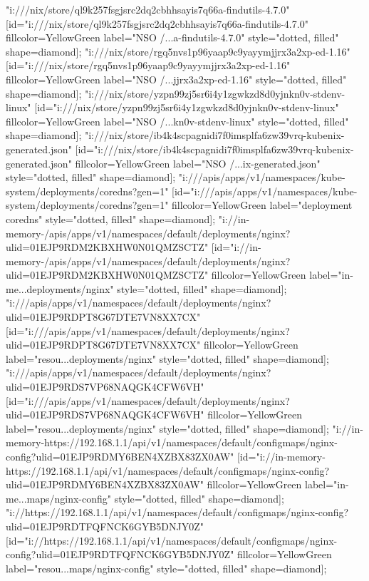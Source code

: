 {"i:///nix/store/ql9k257fsgjsrc2dq2cbhhsayis7q66a-findutils-4.7.0" [id="i:///nix/store/ql9k257fsgjsrc2dq2cbhhsayis7q66a-findutils-4.7.0" fillcolor=YellowGreen label="NSO /...a-findutils-4.7.0" style="dotted, filled" shape=diamond];
"i:///nix/store/rgq5nvs1p96yaap9c9yayymjjrx3a2xp-ed-1.16" [id="i:///nix/store/rgq5nvs1p96yaap9c9yayymjjrx3a2xp-ed-1.16" fillcolor=YellowGreen label="NSO /...jjrx3a2xp-ed-1.16" style="dotted, filled" shape=diamond];
"i:///nix/store/yzpn99zj5sr6i4y1zgwkzd8d0yjnkn0v-stdenv-linux" [id="i:///nix/store/yzpn99zj5sr6i4y1zgwkzd8d0yjnkn0v-stdenv-linux" fillcolor=YellowGreen label="NSO /...kn0v-stdenv-linux" style="dotted, filled" shape=diamond];
"i:///nix/store/ib4k4scpagnidi7f0imsplfa6zw39vrq-kubenix-generated.json" [id="i:///nix/store/ib4k4scpagnidi7f0imsplfa6zw39vrq-kubenix-generated.json" fillcolor=YellowGreen label="NSO /...ix-generated.json" style="dotted, filled" shape=diamond];
"i:///apis/apps/v1/namespaces/kube-system/deployments/coredns?gen=1" [id="i:///apis/apps/v1/namespaces/kube-system/deployments/coredns?gen=1" fillcolor=YellowGreen label="deployment coredns" style="dotted, filled" shape=diamond];
"i://in-memory-/apis/apps/v1/namespaces/default/deployments/nginx?ulid=01EJP9RDM2KBXHW0N01QMZSCTZ" [id="i://in-memory-/apis/apps/v1/namespaces/default/deployments/nginx?ulid=01EJP9RDM2KBXHW0N01QMZSCTZ" fillcolor=YellowGreen label="in-me...deployments/nginx" style="dotted, filled" shape=diamond];
"i:///apis/apps/v1/namespaces/default/deployments/nginx?ulid=01EJP9RDPT8G67DTE7VN8XX7CX" [id="i:///apis/apps/v1/namespaces/default/deployments/nginx?ulid=01EJP9RDPT8G67DTE7VN8XX7CX" fillcolor=YellowGreen label="resou...deployments/nginx" style="dotted, filled" shape=diamond];
"i:///apis/apps/v1/namespaces/default/deployments/nginx?ulid=01EJP9RDS7VP68NAQGK4CFW6VH" [id="i:///apis/apps/v1/namespaces/default/deployments/nginx?ulid=01EJP9RDS7VP68NAQGK4CFW6VH" fillcolor=YellowGreen label="resou...deployments/nginx" style="dotted, filled" shape=diamond];
"i://in-memory-https://192.168.1.1/api/v1/namespaces/default/configmaps/nginx-config?ulid=01EJP9RDMY6BEN4XZBX83ZX0AW" [id="i://in-memory-https://192.168.1.1/api/v1/namespaces/default/configmaps/nginx-config?ulid=01EJP9RDMY6BEN4XZBX83ZX0AW" fillcolor=YellowGreen label="in-me...maps/nginx-config" style="dotted, filled" shape=diamond];
"i://https://192.168.1.1/api/v1/namespaces/default/configmaps/nginx-config?ulid=01EJP9RDTFQFNCK6GYB5DNJY0Z" [id="i://https://192.168.1.1/api/v1/namespaces/default/configmaps/nginx-config?ulid=01EJP9RDTFQFNCK6GYB5DNJY0Z" fillcolor=YellowGreen label="resou...maps/nginx-config" style="dotted, filled" shape=diamond];
}
